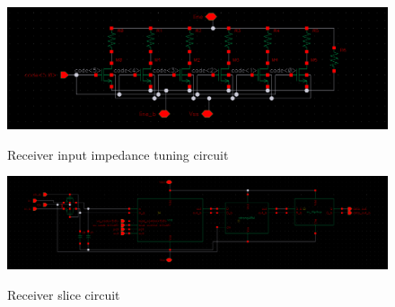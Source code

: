\begin{figure}[H]
  \centering
  {\includegraphics[scale=0.4]{schematics/rx_inp_impedance.png}}
  \caption{Receiver input impedance tuning circuit}
  \label{fig:imp_tuning}
\end{figure}

\begin{figure}[H]
  \centering
  {\includegraphics[scale=0.25]{schematics/receiver_slice.png}}
  \caption{Receiver slice circuit}
  \label{fig:receiver_slice}
\end{figure}


